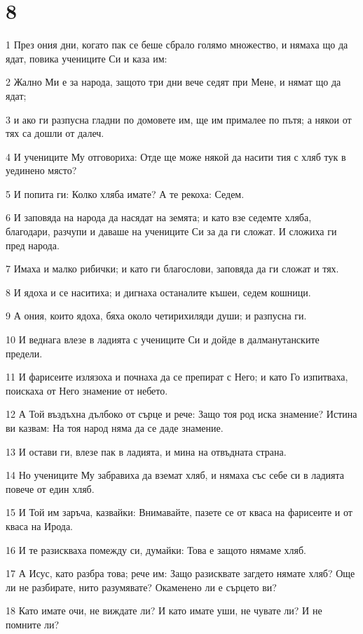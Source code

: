 \chapter{8}

\par 1 През ония дни, когато пак се беше сбрало голямо множество, и нямаха що да ядат, повика учениците Си и каза им:
\par 2 Жално Ми е за народа, защото три дни вече седят при Мене, и нямат що да ядат;
\par 3 и ако ги разпусна гладни по домовете им, ще им прималее по пътя; а някои от тях са дошли от далеч.
\par 4 И учениците Му отговориха: Отде ще може някой да насити тия с хляб тук в уединено място?
\par 5 И попита ги: Колко хляба имате? А те рекоха: Седем.
\par 6 И заповяда на народа да насядат на земята; и като взе седемте хляба, благодари, разчупи и даваше на учениците Си за да ги сложат. И сложиха ги пред народа.
\par 7 Имаха и малко рибички; и като ги благослови, заповяда да ги сложат и тях.
\par 8 И ядоха и се наситиха; и дигнаха останалите къшеи, седем кошници.
\par 9 А ония, които ядоха, бяха около четирихиляди души; и разпусна ги.
\par 10 И веднага влезе в ладията с учениците Си и дойде в далманутанските предели.
\par 11 И фарисеите излязоха и почнаха да се препират с Него; и като Го изпитваха, поискаха от Него знамение от небето.
\par 12 А Той въздъхна дълбоко от сърце и рече: Защо тоя род иска знамение? Истина ви казвам: На тоя народ няма да се даде знамение.
\par 13 И остави ги, влезе пак в ладията, и мина на отвъдната страна.
\par 14 Но учениците Му забравиха да вземат хляб, и нямаха със себе си в ладията повече от един хляб.
\par 15 И Той им заръча, казвайки: Внимавайте, пазете се от кваса на фарисеите и от кваса на Ирода.
\par 16 И те разискваха помежду си, думайки: Това е защото нямаме хляб.
\par 17 А Исус, като разбра това; рече им: Защо разисквате загдето нямате хляб? Още ли не разбирате, нито разумявате? Окаменено ли е сърцето ви?
\par 18 Като имате очи, не виждате ли? И като имате уши, не чувате ли? И не помните ли?
